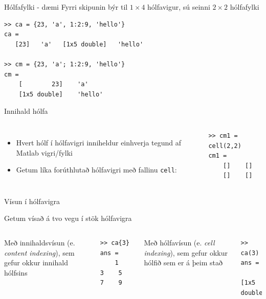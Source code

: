 \documentclass{beamer}
\begin{document}
\begin{frame}[fragile]{Hólfafylki - dæmi}
Fyrri skipunin býr til $1\times 4$ hólfavigur, sú seinni $2 \times 2$ hólfafylki
\begin{verbatim}
>> ca = {23, 'a', 1:2:9, 'hello'} 
ca = 
   [23]   'a'   [1x5 double]   'hello'

>> cm = {23, 'a'; 1:2:9, 'hello'}
cm = 
    [        23]    'a'    
    [1x5 double]    'hello'
\end{verbatim}
\end{frame}

\begin{frame}[fragile]{Innihald hólfa}
\begin{columns}
\begin{itemize}
 \item Hvert hólf í hólfavigri inniheldur einhverja tegund af Matlab vigri/fylki
 \item Getum líka forúthlutað hólfavigri með fallinu \texttt{cell}:
\end{itemize}
\begin{verbatim}
>> cm1 = cell(2,2)
cm1 = 
    []    []
    []    []
\end{verbatim}
\end{columns}
\end{frame}

\begin{frame}[fragile]{Vísun í hólfavigra}
\begin{center}
Getum vísað á tvo vegu í stök hólfavigra
\end{center}

\begin{columns}
Með innihaldsvísun (e. \emph{content indexing}), sem gefur okkur innihald hólfsins
\begin{verbatim}
>> ca{3}
ans =
    1    3    5    7    9
\end{verbatim}
Með hólfavísun (e. \emph{cell indexing}), sem gefur okkur hólfið sem er á þeim stað
\begin{verbatim}
>> ca(3)
ans = 
    [1x5 double]
\end{verbatim}
\end{columns}
\end{frame}
\end{document}
